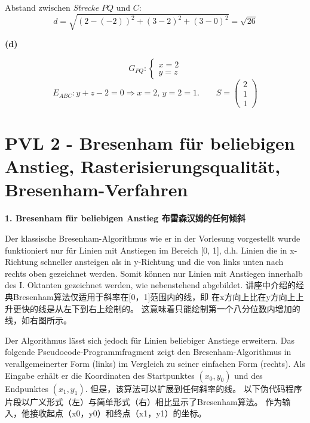 \documentclass[fleqn]{article}
\begin{document}
\indent\indent\indent Abstand zwischen \textit{Strecke} $PQ$ und $C$:
$$d=\sqrt{(2-(-2))^2+(3-2)^2+(3-0)^2}=\sqrt{26}$$

\indent\indent\textbf{(d)}

$$G_{PQ}:\left\{
    \begin{aligned}
       x=2\\y=z
    \end{aligned}
    \right.$$
$$E_{ABC}:y+z-2=0\Rightarrow x=2,\,y=2=1.\qquad S=\begin{pmatrix}
    2\\1\\1
\end{pmatrix}$$

\newpage

\section{PVL 2 - Bresenham für beliebigen Anstieg, Rasterisierungsqualität, Bresenham-Verfahren}

\noindent\textbf{1. Bresenham für beliebigen Anstieg 布雷森汉姆的任何倾斜}

Der klassische Bresenham-Algorithmus wie er in der Vorlesung vorgestellt wurde funktioniert
 nur für Linien mit Anstiegen im Bereich [0, 1], d.h. Linien die in x-Richtung schneller 
 ansteigen als in y-Richtung und die von links unten nach rechts oben gezeichnet werden. 
 Somit können nur Linien mit Anstiegen innerhalb des I. Oktanten gezeichnet werden, 
 wie nebenstehend abgebildet.
 讲座中介绍的经典Bresenham算法仅适用于斜率在[0，1]范围内的线，即 在x方向上比在y方向上上升更快的线是从左下到右上绘制的。 这意味着只能绘制第一个八分位数内增加的线，如右图所示。

Der Algorithmus lässt sich jedoch für Linien beliebiger Anstiege erweitern. 
Das folgende Pseudocode-Programmfragment zeigt den Bresenham-Algorithmus in 
verallgemeinerter Form (links) im Vergleich zu seiner einfachen Form (rechts). 
Als Eingabe erhält er die Koordinaten des Startpunktes $(x_0, y_0)$ und des Endpunktes $(x_1, y_1)$.
但是，该算法可以扩展到任何斜率的线。 以下伪代码程序片段以广义形式（左）与简单形式（右）相比显示了Bresenham算法。 作为输入，他接收起点（x0，y0）和终点（x1，y1）的坐标。
\end{document}

